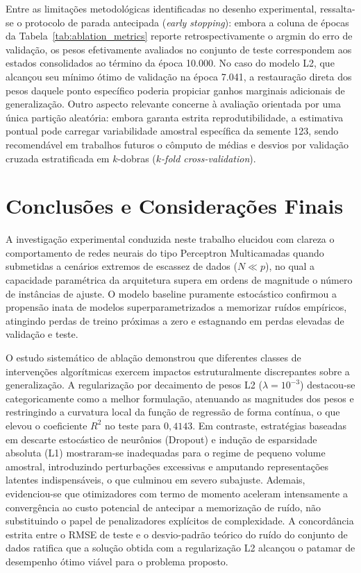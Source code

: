 \documentclass[11pt,a4paper]{article}
\begin{document}
Entre as limitações metodológicas identificadas no desenho experimental, ressalta-se o protocolo de parada antecipada (\textit{early stopping}): embora a coluna de épocas da Tabela~\ref{tab:ablation_metrics} reporte retrospectivamente o argmin do erro de validação, os pesos efetivamente avaliados no conjunto de teste correspondem aos estados consolidados ao término da época 10.000. No caso do modelo L2, que alcançou seu mínimo ótimo de validação na época 7.041, a restauração direta dos pesos daquele ponto específico poderia propiciar ganhos marginais adicionais de generalização. Outro aspecto relevante concerne à avaliação orientada por uma única partição aleatória: embora garanta estrita reprodutibilidade, a estimativa pontual pode carregar variabilidade amostral específica da semente 123, sendo recomendável em trabalhos futuros o cômputo de médias e desvios por validação cruzada estratificada em $k$-dobras (\textit{$k$-fold cross-validation}).

\section{Conclusões e Considerações Finais}

A investigação experimental conduzida neste trabalho elucidou com clareza o comportamento de redes neurais do tipo Perceptron Multicamadas quando submetidas a cenários extremos de escassez de dados ($N \ll p$), no qual a capacidade paramétrica da arquitetura supera em ordens de magnitude o número de instâncias de ajuste. O modelo baseline puramente estocástico confirmou a propensão inata de modelos superparametrizados a memorizar ruídos empíricos, atingindo perdas de treino próximas a zero e estagnando em perdas elevadas de validação e teste.

O estudo sistemático de ablação demonstrou que diferentes classes de intervenções algorítmicas exercem impactos estruturalmente discrepantes sobre a generalização. A regularização por decaimento de pesos L2 ($\lambda = 10^{-3}$) destacou-se categoricamente como a melhor formulação, atenuando as magnitudes dos pesos e restringindo a curvatura local da função de regressão de forma contínua, o que elevou o coeficiente $R^2$ no teste para $0{,}4143$. Em contraste, estratégias baseadas em descarte estocástico de neurônios (Dropout) e indução de esparsidade absoluta (L1) mostraram-se inadequadas para o regime de pequeno volume amostral, introduzindo perturbações excessivas e amputando representações latentes indispensáveis, o que culminou em severo subajuste. Ademais, evidenciou-se que otimizadores com termo de momento aceleram intensamente a convergência ao custo potencial de antecipar a memorização de ruído, não substituindo o papel de penalizadores explícitos de complexidade. A concordância estrita entre o RMSE de teste e o desvio-padrão teórico do ruído do conjunto de dados ratifica que a solução obtida com a regularização L2 alcançou o patamar de desempenho ótimo viável para o problema proposto.
\end{document}
